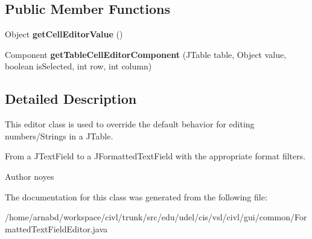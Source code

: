 \subsection*{Public Member Functions}
\begin{DoxyCompactItemize}
\item 
\hypertarget{classedu_1_1udel_1_1cis_1_1vsl_1_1civl_1_1gui_1_1common_1_1FormattedTextFieldEditor_a63f695d5e3f2aa3dae4f93189bb73769}{}Object {\bfseries get\+Cell\+Editor\+Value} ()\label{classedu_1_1udel_1_1cis_1_1vsl_1_1civl_1_1gui_1_1common_1_1FormattedTextFieldEditor_a63f695d5e3f2aa3dae4f93189bb73769}

\item 
\hypertarget{classedu_1_1udel_1_1cis_1_1vsl_1_1civl_1_1gui_1_1common_1_1FormattedTextFieldEditor_a4e6fbd8a3dfc40572765cd326397653e}{}Component {\bfseries get\+Table\+Cell\+Editor\+Component} (J\+Table table, Object value, boolean is\+Selected, int row, int column)\label{classedu_1_1udel_1_1cis_1_1vsl_1_1civl_1_1gui_1_1common_1_1FormattedTextFieldEditor_a4e6fbd8a3dfc40572765cd326397653e}

\end{DoxyCompactItemize}


\subsection{Detailed Description}
This editor class is used to override the default behavior for editing numbers/\+Strings in a J\+Table. 

From a {\ttfamily J\+Text\+Field} to a {\ttfamily J\+Formatted\+Text\+Field} with the appropriate format filters.

\begin{DoxyAuthor}{Author}
noyes 
\end{DoxyAuthor}


The documentation for this class was generated from the following file\+:\begin{DoxyCompactItemize}
\item 
/home/arnabd/workspace/civl/trunk/src/edu/udel/cis/vsl/civl/gui/common/Formatted\+Text\+Field\+Editor.\+java\end{DoxyCompactItemize}

